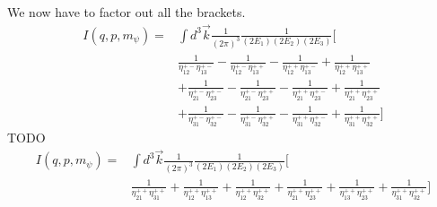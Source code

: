 We now have to factor out all the brackets.
\begin{align*}
I(q,p,m_\psi) =& \int d^3 \vec{k} \frac{1}{(2\pi)^3} \frac{1}{(2E_1)(2E_2)(2E_3)}\Bigg[\\
    &\frac{1}{\eta_{12}^{+-}\eta_{13}^{+-}} - \frac{1}{\eta_{12}^{+-}\eta_{13}^{++}} - \frac{1}{\eta_{12}^{++}\eta_{13}^{+-}} + \frac{1}{\eta_{12}^{++}\eta_{13}^{++}}\\
    &+ \frac{1}{\eta_{21}^{+-}\eta_{23}^{+-}} - \frac{1}{\eta_{21}^{+-}\eta_{23}^{++}} - \frac{1}{\eta_{21}^{++}\eta_{23}^{+-}} + \frac{1}{\eta_{21}^{++}\eta_{23}^{++}}\\
    &+ \frac{1}{\eta_{31}^{+-}\eta_{32}^{+-}} - \frac{1}{\eta_{31}^{+-}\eta_{32}^{++}} - \frac{1}{\eta_{31}^{++}\eta_{32}^{+-}} + \frac{1}{\eta_{31}^{++}\eta_{32}^{++}}
\Bigg]
\end{align*}
TODO
\begin{align*}
I(q,p,m_\psi) =& \int d^3 \vec{k} \frac{1}{(2\pi)^3} \frac{1}{(2E_1)(2E_2)(2E_3)}\Bigg[\\
      &\frac{1}{\eta_{21}^{++}\eta_{31}^{++}} + \frac{1}{\eta_{12}^{++}\eta_{13}^{++}}
    + \frac{1}{\eta_{12}^{++}\eta_{32}^{++}} + \frac{1}{\eta_{21}^{++}\eta_{23}^{++}}
    + \frac{1}{\eta_{13}^{++}\eta_{23}^{++}} + \frac{1}{\eta_{31}^{++}\eta_{32}^{++}}
\Bigg]
\end{align*}


